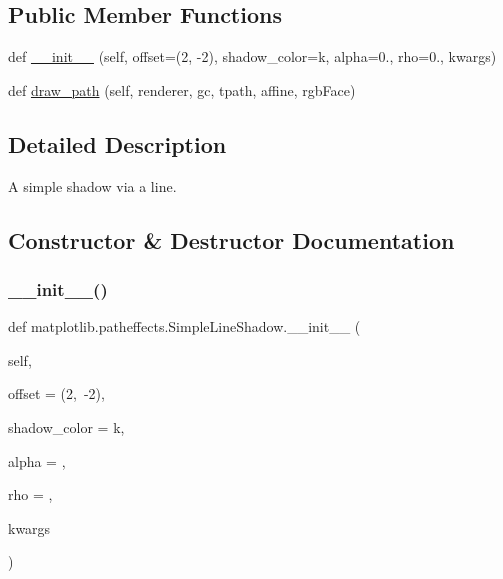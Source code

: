 \subsection*{Public Member Functions}
\begin{DoxyCompactItemize}
\item 
def \hyperlink{classmatplotlib_1_1patheffects_1_1SimpleLineShadow_a736e16b2b52a7ed8c4f4519fba0799ce}{\+\_\+\+\_\+init\+\_\+\+\_\+} (self, offset=(2, -\/2), shadow\+\_\+color=\textquotesingle{}k\textquotesingle{}, alpha=0., rho=0., kwargs)
\item 
def \hyperlink{classmatplotlib_1_1patheffects_1_1SimpleLineShadow_a1018cb753f7fa1c14eef2e654508e42d}{draw\+\_\+path} (self, renderer, gc, tpath, affine, rgb\+Face)
\end{DoxyCompactItemize}


\subsection{Detailed Description}
\begin{DoxyVerb}A simple shadow via a line.\end{DoxyVerb}
 

\subsection{Constructor \& Destructor Documentation}
\mbox{\label{classmatplotlib_1_1patheffects_1_1SimpleLineShadow_a736e16b2b52a7ed8c4f4519fba0799ce}} 
\subsubsection{\texorpdfstring{\+\_\+\+\_\+init\+\_\+\+\_\+()}{\_\_init\_\_()}}
{\footnotesize\ttfamily def matplotlib.\+patheffects.\+Simple\+Line\+Shadow.\+\_\+\+\_\+init\+\_\+\+\_\+ (\begin{DoxyParamCaption}\item[{}]{self,  }\item[{}]{offset = {\ttfamily (2,~-\/2)},  }\item[{}]{shadow\+\_\+color = {\ttfamily \textquotesingle{}k\textquotesingle{}},  }\item[{}]{alpha = {},  }\item[{}]{rho = {},  }\item[{}]{kwargs }\end{DoxyParamCaption})}

